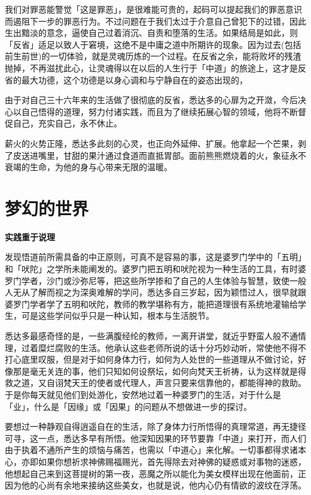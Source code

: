 \documentclass[twoside,openany]{book}
\newcommand{\mt}[1]{\textbullet \textbf{#1}}
\begin{document}
我们对罪恶能警觉「这是罪恶」，是很难能可贵的，起码可以提起我们的罪恶意识而遏阻下一步的罪恶行为。不过问题在于我们太过于介意自己曾犯下的过错，因此生出黯淡的意念，逼使自己过着消沉、自责和堕落的生活。如果结局是如此，则「反省」适足以致人于窘境，这绝不是中庸之道中所期许的现象。因为过去(包括前生前世)的一切体验，就是灵魂历炼的一个过程。在反省之余，能将败坏的残渣抛掉，不再滋扰此心，让灵魂得以在以后的人生行于「中道」的旅途上，这才是反省的最大功德，这个功德是以身心调和与宁静自在的姿态出现的，



由于对自己三十六年来的生活做了很彻底的反省，悉达多的心扉为之开潋，今后决心以自己悟得的道理，努力付诸实践，而且为了继续拓展心智的领域，他将不断督促自己，充实自己，永不休止。

薪火的火势正隆，悉达多此刻的心灵，也正向外延伸、扩展。他拿起一个芒果，剥了皮送进嘴里，甘甜的果汁通过食道而直抵胃部。面前熊熊燃烧着的火，象征永不衰竭的生命，为他的身与心带来无限的温暖。

\section{梦幻的世界}\label{sec1.14}

\mt{实践重于说理}

发现悟道前所需具备的中正原则，可真不是容易的事，这是婆罗门学中的「五明」和「吠陀」之学所未能阐发的。婆罗门把五明和吠陀视为一种生活的工具，有时婆罗门学者，沙门或沙弥尼等，把这些所学掺和了自己的人生体验与智慧，致使一般人无从了解而视之为深奥难解的学问，悉达多自三岁起，因为颖悟过人，很早就跟婆罗门学者学了五明和吠陀，教师的教学堪称有方，能把道理很有系统地灌输给学生，可是这些学问似乎只是一种认知，根本与生活脱节。

悉达多最感奇怪的是，一些满腹经纶的教师，一离开讲堂，就近乎野蛮人般不通情理，过着糜烂腐败的生活。他承认这些老师所说的话十分巧妙动听，常使他不得不打心底里叹服，但是对于如何身体力行，如何为人处世的一些道理从不做讨论，好像那是毫无关连的事，他们只知如何设祭坛，如何向梵天王祈祷，认为这样就是得救之道，又自诩梵天王的使者或代理人，声言只要来信靠他的，都能得神的救助。于是你每天就见他们到处游化，安然地过着一种婆罗门的生活，对于什么是「业」，什么是「因缘」或「因果」的问题从不想做进一步的探讨。

要想过一种静观自得逍遥自在的生活，除了身体力行所悟得的真理常道，再无捷径可寻，这一点，悉达多早有所悟。他深知因果的环节要靠「中道」来打开，而人们由于执着不通所产生的烦恼与痛苦，也需以「中道心」来化解。一切事都得求诸本心，亦即如果你想祈求神佛赐福赐光，首先得除去对神佛的疑惑或对事物的迷惑，他想起自己来到这菩提树的第一夜，恶魔之所以能化为美女模样出现在他面前，正因为他的心尚有余地来接纳这些美女，也就是说，他内心仍有情欲的波纹在浮荡。
\end{document}
